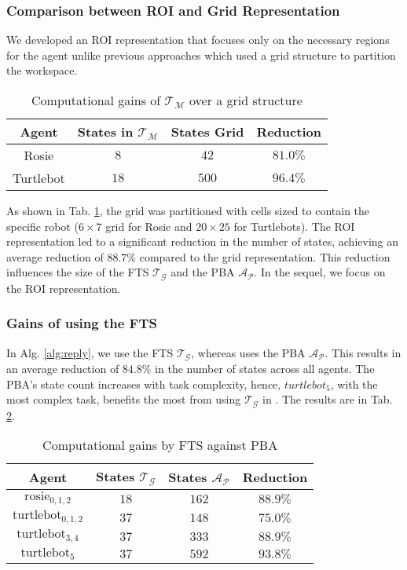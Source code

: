 \subsubsection{Comparison between ROI and Grid Representation}
We developed an ROI representation that focuses only on the necessary regions for the agent unlike previous approaches \cite{meng_paper} which used a grid structure to partition the workspace. 
\begin{table}[b]
    \centering
    \begin{tabular}{c||c|c|c}
        \textbf{Agent} &  \textbf{States in $\mathcal{T}_{\mathcal{M}}$} &\textbf{States Grid} & \textbf{Reduction}\\
        \hline\hline
        Rosie &  $8$ & $42$ & $81.0\%$\\
        \hline
        Turtlebot&  $18$ & $500$ & $96.4\%$\\
        \hline\hline
    \end{tabular}
    \caption{Computational gains of $\mathcal{T}_{\mathcal{M}}$ over a grid structure}
    \label{tab:motion-state-reduction}
\end{table}
As shown in Tab. \ref{tab:motion-state-reduction}, the grid was partitioned with cells sized to contain the specific robot ($6\times7$ grid for Rosie and $20\times25$ for Turtlebots). 
The ROI representation led to a significant reduction in the number of states, achieving an average reduction of $88.7\%$ compared to the grid representation. This reduction influences the size of the FTS $\mathcal{T}_{\mathcal{G}}$ and the PBA $\mathcal{A_P}$. In the sequel, we focus on the ROI representation.

\subsubsection{Gains of using the FTS}
In Alg. \ref{alg:reply}, we use the FTS $\mathcal{T}_{\mathcal{G}}$, whereas \cite{meng_paper} uses the PBA $\mathcal{A_P}$. This results in an average reduction of $84.8\%$ in the number of states across all agents. The PBA's state count increases with task complexity, hence, $turtlebot_5$, with the most complex task, benefits the most from using $\mathcal{T}_{\mathcal{G}}$ in \Dijkstra. The results are in Tab. \ref{tab:state-reduction}.
\begin{table}[t]
    \centering
    \begin{tabular}{c||c|c|c}
        \textbf{Agent} &  \textbf{States $\mathcal{T}_{\mathcal{G}}$} &\textbf{States $\mathcal{A_P}$} & \textbf{Reduction}\\
        \hline\hline
        $\mathrm{rosie}_{0,1,2}$ &  $18$ & $162$ & $88.9\%$\\
        \hline
        $\mathrm{turtlebot}_{0,1,2}$ &  $37$ & $148$ & $75.0\%$\\
        \hline
        $\mathrm{turtlebot}_{3,4}$ &  $37$ & $333$ & $88.9\%$\\
        \hline
        $\mathrm{turtlebot}_5$ &  $37$ & $592$ & $93.8\%$\\
        \hline\hline
    \end{tabular}
    \caption{Computational gains by FTS against PBA}
    \label{tab:state-reduction}
\end{table}
